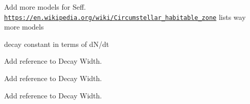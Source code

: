
\begin{DoxyRefList}
\item[\label{todo__todo000001}%
\Hypertarget{todo__todo000001}%
Namespace \hyperlink{namespace_e_g_x_phys}{E\+G\+X\+Phys} ]Add more models for Seff. \href{https://en.wikipedia.org/wiki/Circumstellar_habitable_zone}{\tt https\+://en.\+wikipedia.\+org/wiki/\+Circumstellar\+\_\+habitable\+\_\+zone} lists way more models 

decay constant in terms of d\+N/dt  
\item[\label{todo__todo000003}%
\Hypertarget{todo__todo000003}%
Module \hyperlink{group___half_life}{Half\+Life} ]Add reference to Decay Width.  
\item[\label{todo__todo000004}%
\Hypertarget{todo__todo000004}%
Module \hyperlink{group___nuclear_binding_energy}{Nuclear\+Binding\+Energy} ]Add reference to Decay Width.  
\item[\label{todo__todo000005}%
\Hypertarget{todo__todo000005}%
Module \hyperlink{group___semi_empirical_mass_formula}{Semi\+Empirical\+Mass\+Formula} ]Add reference to Decay Width. 
\end{DoxyRefList}